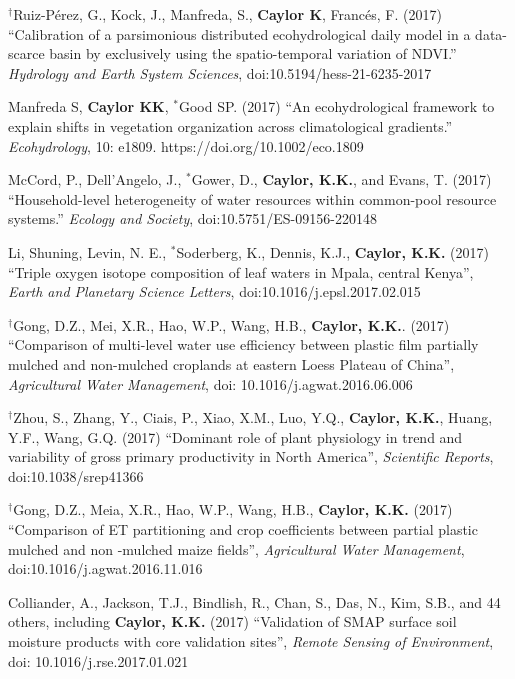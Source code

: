 \documentclass[10pt]{report}
\begin{document}
\begin{etaremune}
\item $^{\dagger}$Ruiz-P\'erez, G., Kock, J., Manfreda, S., \textbf{Caylor K}, Franc\'es, F. (2017) ``Calibration of a parsimonious distributed ecohydrological daily model in a data-scarce basin by exclusively using the spatio-temporal variation of NDVI.'' {\em Hydrology and Earth System Sciences}, doi:10.5194/hess-21-6235-2017 

\item Manfreda S, \textbf{Caylor KK},  $^{*}$Good SP.  (2017) ``An ecohydrological framework to explain shifts in vegetation organization across climatological gradients.'' {\em Ecohydrology}, 10: e1809. https://doi.org/10.1002/eco.1809

\item McCord, P., Dell'Angelo, J., $^{*}$Gower, D.,  \textbf{Caylor, K.K.}, and Evans, T. (2017) ``Household-level heterogeneity of water resources within common-pool resource systems.'' {\em Ecology and Society}, doi:10.5751/ES-09156-220148

\item Li, Shuning, Levin, N. E.,  $^{*}$Soderberg, K., Dennis, K.J., \textbf{Caylor, K.K.} (2017) ``Triple oxygen isotope composition of leaf waters in Mpala, central Kenya'', {\em Earth and Planetary Science Letters}, doi:10.1016/j.epsl.2017.02.015

\item $^{\dagger}$Gong, D.Z., Mei, X.R., Hao, W.P., Wang, H.B., \textbf{Caylor, K.K.}. (2017) ``Comparison of multi-level water use efficiency between plastic film partially mulched and non-mulched croplands at eastern Loess Plateau of China'', {\em Agricultural Water Management}, doi: 10.1016/j.agwat.2016.06.006

\item $^{\dagger}$Zhou, S., Zhang, Y., Ciais, P., Xiao, X.M., Luo, Y.Q., \textbf{Caylor, K.K.}, Huang, Y.F., Wang, G.Q. (2017) ``Dominant role of plant physiology in trend and variability of gross primary productivity in North America'', {\em Scientific Reports}, doi:10.1038/srep41366

\item $^{\dagger}$Gong, D.Z., Meia, X.R., Hao, W.P., Wang, H.B., \textbf{Caylor, K.K.} (2017) ``Comparison of ET partitioning and crop coefficients between partial plastic mulched and non -mulched maize fields'', {\em Agricultural Water Management}, doi:10.1016/j.agwat.2016.11.016

\item Colliander, A., Jackson, T.J., Bindlish, R., Chan, S., Das, N., Kim, S.B., and  44 others, including \textbf{Caylor, K.K.} (2017) ``Validation of SMAP surface soil moisture products with core validation sites'', {\em Remote Sensing of Environment}, doi: 10.1016/j.rse.2017.01.021


\end{etaremune}
\end{document}
